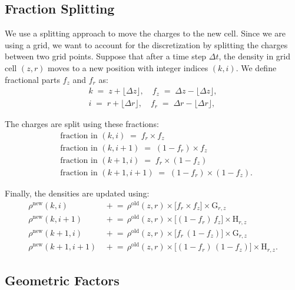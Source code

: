 \subsection{Fraction Splitting}\label{ch3:sec:frac_split}
We use a splitting approach to move the charges to the new cell. Since we are using a grid, we want to account for the discretization by splitting the charges between two grid points. Suppose that after a time step $\Delta t$, the density in grid cell $(z,r)$ moves to a new position with integer indices $(k,i)$. We define fractional parts $f_z$ and $f_r$ as:
%
\begin{align}
k \;=\; z + \lfloor \Delta z \rfloor,\quad
f_z \;=\; \Delta z - \lfloor \Delta z \rfloor,\\
i \;=\; r + \lfloor \Delta r \rfloor,\quad
f_r \;=\; \Delta r - \lfloor \Delta r \rfloor,
\end{align}


The charges are split using these fractions:
\begin{align}
&\text{fraction in }(k, i)   \;=\; f_{r} \times f_{z} \\
&\text{fraction in }(k, i+1) \;=\; (1 - f_{r}) \times f_{z}\\
&\text{fraction in }(k+1, i) \;=\; f_{r} \times (1 - f_{z})\\
&\text{fraction in }(k+1, i+1)\;=\; (1 - f_{r}) \times (1 - f_{z}).
\label{eq:bilinear-fractions}
\end{align}

Finally, the densities are updated using:
\begin{align}
\rho^{\mathrm{new}}(k,i)   &\,\mathrel{+}=\, \rho^{\mathrm{old}}(z,r)\times \bigl[f_{r}\times f_{z}\bigr] \times \text{G}_{r,z} \label{ch3:eq:den_update_1} \\
\rho^{\mathrm{new}}(k,i+1) &\,\mathrel{+}=\, \rho^{\mathrm{old}}(z,r)\times \bigl[(1 - f_{r})\,f_{z}\bigr] \times \text{H}_{r,z} \label{ch3:eq:den_update_2} \\
\rho^{\mathrm{new}}(k+1,i) &\,\mathrel{+}=\, \rho^{\mathrm{old}}(z,r)\times \bigl[f_{r}\,(1 - f_{z})\bigr] \times \text{G}_{r,z} \label{ch3:eq:den_update_3} \\
\rho^{\mathrm{new}}(k+1,i+1)&\,\mathrel{+}=\, \rho^{\mathrm{old}}(z,r)\times \bigl[(1 - f_{r})\,(1 - f_{z})\bigr] \times \text{H}_{r,z}. \label{ch3:eq:den_update_4}
\end{align}
\subsection{Geometric Factors}
\label{sec:geom-factor}


